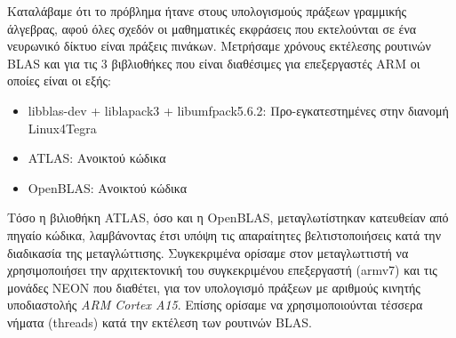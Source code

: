 Καταλάβαμε ότι το πρόβλημα ήτανε στους υπολογισμούς πράξεων γραμμικής άλγεβρας,
αφού όλες σχεδόν οι μαθηματικές εκφράσεις που εκτελούνται σε ένα
νευρωνικό δίκτυο είναι πράξεις πινάκων. Μετρήσαμε χρόνους εκτέλεσης
ρουτινών BLAS και για τις 3 βιβλιοθήκες που είναι διαθέσιμες για
επεξεργαστές ARM οι οποίες είναι οι εξής:
\begin{itemize}
  \item{libblas-dev + liblapack3 + libumfpack5.6.2: Προ-εγκατεστημένες στην διανομή Linux4Tegra}
  \item{ATLAS: Ανοικτού κώδικα}
  \item{OpenBLAS: Ανοικτού κώδικα}
\end{itemize}

Τόσο η βιλιοθήκη ATLAS, όσο και η OpenBLAS, μεταγλωτίστηκαν κατευθείαν από πηγαίο κώδικα,
λαμβάνοντας έτσι υπόψη τις απαραίτητες βελτιστοποιήσεις κατά την διαδικασία
της μεταγλώττισης. Συγκεκριμένα ορίσαμε στον μεταγλωττιστή να χρησιμοποιήσει την αρχιτεκτονική του
συγκεκριμένου επεξεργαστή (armv7) και τις μονάδες
NEON που διαθέτει, για τον υπολογισμό πράξεων με αριθμούς κινητής
υποδιαστολής \emph{ARM Cortex A15}. Επίσης ορίσαμε να χρησιμοποιούνται
τέσσερα νήματα (threads) κατά την εκτέλεση των ρουτινών BLAS.

